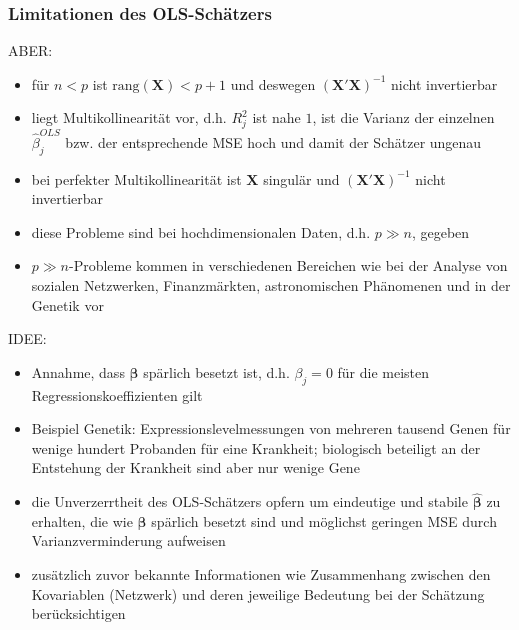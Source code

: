\documentclass{beamer}
\begin{document}
\begin{frame} %
  \frametitle{Limitationen des OLS-Schätzers} 
  ABER: 
    \begin{itemize}
    \pause \item für $n < p$ ist $\text{rang}(\mathbf{X}
    )<p+1$ und deswegen $\left(\mathbf{X}'\mathbf{X}\right)^{-1}$ nicht invertierbar
    \pause \item liegt Multikollinearität vor, d.h. $R^2_j$ ist nahe $1$, ist die Varianz der einzelnen $\hat{\beta}_j^{OLS}$ bzw. der entsprechende MSE hoch und damit der Schätzer ungenau
    \pause \item bei perfekter Multikollinearität ist $\mathbf{X}$ singulär und $\left(\mathbf{X}'\mathbf{X}\right)^{-1}$ nicht invertierbar
    \end{itemize}
    \begin{itemize}
    \pause \item diese Probleme sind bei hochdimensionalen Daten, d.h. $p \gg n$, gegeben
    \item $p \gg n$-Probleme kommen in verschiedenen Bereichen wie bei der Analyse von sozialen Netzwerken, Finanzmärkten, astronomischen Phänomenen und in der Genetik vor
    \end{itemize}
    
\end{frame}

\begin{frame}
	IDEE:
	\begin{itemize}
	\pause \item Annahme, dass $\boldsymbol{\beta}$ spärlich besetzt ist, d.h. $\beta_j=0$ für die meisten Regressionskoeffizienten gilt
	\pause \item Beispiel Genetik: Expressionslevelmessungen von mehreren tausend Genen für wenige hundert Probanden für eine Krankheit; biologisch beteiligt an der Entstehung der Krankheit sind aber nur wenige Gene
	\pause \item die Unverzerrtheit des OLS-Schätzers {\glqq}opfern{\grqq} um eindeutige und stabile $\boldsymbol{\hat{\beta}}$ zu erhalten, die wie $\boldsymbol{\beta}$ spärlich besetzt sind und möglichst geringen MSE durch Varianzverminderung aufweisen
	\pause \item zusätzlich zuvor bekannte Informationen wie Zusammenhang zwischen den Kovariablen (Netzwerk) und deren jeweilige Bedeutung bei der Schätzung berücksichtigen
	\end{itemize}
\end{frame}
\end{document}
